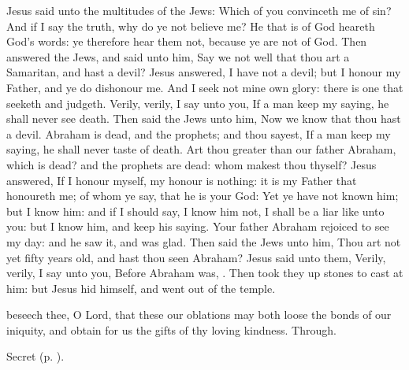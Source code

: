  Jesus said unto the multitudes of the Jews: Which of you convinceth me of sin? And if I say the truth, why do ye not believe me? He that is of God heareth God's words: ye therefore hear them not, because ye are not of God. Then answered the Jews, and said unto him, Say we not well that thou art a Samaritan, and hast a devil? Jesus answered, I have not a devil; but I honour my Father, and ye do dishonour me. And I seek not mine own glory: there is one that seeketh and judgeth. Verily, verily, I say unto you, If a man keep my saying, he shall never see death. Then said the Jews unto him, Now we know that thou hast a devil. Abraham is dead, and the prophets; and thou sayest, If a man keep my saying, he shall never taste of death. Art thou greater than our father Abraham, which is dead? and the prophets are dead: whom makest thou thyself? Jesus answered, If I honour myself, my honour is nothing: it is my Father that honoureth me; of whom ye say, that he is your God: Yet ye have not known him; but I know him: and if I should say, I know him not, I shall be a liar like unto you: but I know him, and keep his saying. Your father Abraham rejoiced to see my day: and he saw it, and was glad. Then said the Jews unto him, Thou art not yet fifty years old, and hast thou seen Abraham? Jesus said unto them, Verily, verily, I say unto you, Before Abraham was, . Then took they up stones to cast at him: but Jesus hid himself, and went out of the temple.


\vspace{-0.4\baselineskip}

\secret

\vspace{-0.1\baselineskip}

 beseech thee, O Lord, that these our oblations may both loose the bonds of our iniquity, and obtain for us the gifts of thy loving kindness. Through.

\begin{rubric}
     Secret  (p. \pageref{AshWednesdayMassSecret}).
\end{rubric}


